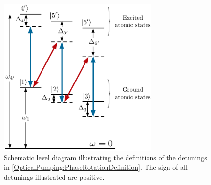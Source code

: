 \begin{figure}
    \centering
    \includegraphics[width=8cm]{PhaseRotationDefinition}
    \caption{Schematic level diagram illustrating the definitions of the detunings in \eqref{OpticalPumping:PhaseRotationDefinition}. The sign of all detunings illustrated are positive.}
    \label{OpticalPumping:PhaseRotationDefinition}
\end{figure}

